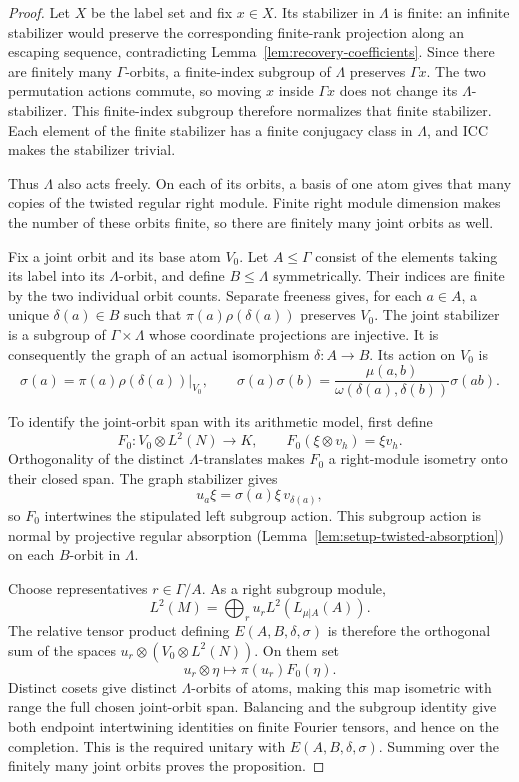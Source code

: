 \begin{proof}
Let $X$ be the label set and fix $x\in X$.  Its stabilizer in $\Lambda$
is finite: an infinite stabilizer would preserve the corresponding
finite-rank projection along an escaping sequence, contradicting
Lemma~\ref{lem:recovery-coefficients}.  Since there are finitely many
$\Gamma$-orbits, a finite-index subgroup of $\Lambda$ preserves
$\Gamma x$.  The two permutation actions commute, so moving $x$ inside
$\Gamma x$ does not change its $\Lambda$-stabilizer.  This finite-index
subgroup therefore normalizes that finite stabilizer.  Each element of
the finite stabilizer has a finite conjugacy class in $\Lambda$, and ICC makes the
stabilizer trivial.

Thus $\Lambda$ also acts freely.  On each of its orbits, a basis of one
atom gives that many copies of the twisted regular right module.  Finite
right module dimension makes the number of these orbits finite, so there
are finitely many joint orbits as well.

Fix a joint orbit and its base atom $V_0$.  Let $A\leq\Gamma$ consist
of the elements taking its label into its $\Lambda$-orbit, and define
$B\leq\Lambda$ symmetrically.  Their indices are finite by the two
individual orbit counts.  Separate freeness gives, for each $a\in A$,
a unique $\delta(a)\in B$ such that $\pi(a)\rho(\delta(a))$ preserves
$V_0$.  The joint stabilizer is a subgroup of
$\Gamma\times\Lambda$ whose coordinate projections are injective.
It is consequently the graph of an actual isomorphism $\delta:A\to B$.
Its action on $V_0$ is
\[
 \sigma(a)=\left.\pi(a)\rho(\delta(a))\right|_{V_0},\qquad
 \sigma(a)\sigma(b)
   =\frac{\mu(a,b)}{\omega(\delta(a),\delta(b))}\sigma(ab).
\]

To identify the joint-orbit span with its arithmetic model, first define
\[
 F_0:V_0\otimes L^2(N)\longrightarrow K,
 \qquad F_0(\xi\otimes v_h)=\xi v_h.
\]
Orthogonality of the distinct $\Lambda$-translates makes $F_0$ a
right-module isometry onto their closed span.  The graph stabilizer gives
\[
 u_a\xi=\sigma(a)\xi\,v_{\delta(a)},
\]
so $F_0$ intertwines the stipulated left subgroup action.  This subgroup
action is normal by projective regular absorption
(Lemma~\ref{lem:setup-twisted-absorption}) on each $B$-orbit in $\Lambda$.

Choose representatives $r\in\Gamma/A$.  As a right subgroup module,
\[
 L^2(M)=\bigoplus_r u_rL^2(L_{\mu|A}(A)).
\]
The relative tensor product defining $E(A,B,\delta,\sigma)$ is therefore
the orthogonal sum of the spaces
$u_r\otimes(V_0\otimes L^2(N))$.  On them set
\[
 u_r\otimes\eta\longmapsto\pi(u_r)F_0(\eta).
\]
Distinct cosets give distinct $\Lambda$-orbits of atoms, making this map
isometric with range the full chosen joint-orbit span.  Balancing and
the subgroup identity give both endpoint intertwining identities on
finite Fourier tensors, and hence on the completion.  This is the
required unitary with $E(A,B,\delta,\sigma)$.  Summing over the finitely
many joint orbits proves the proposition.
\end{proof}

